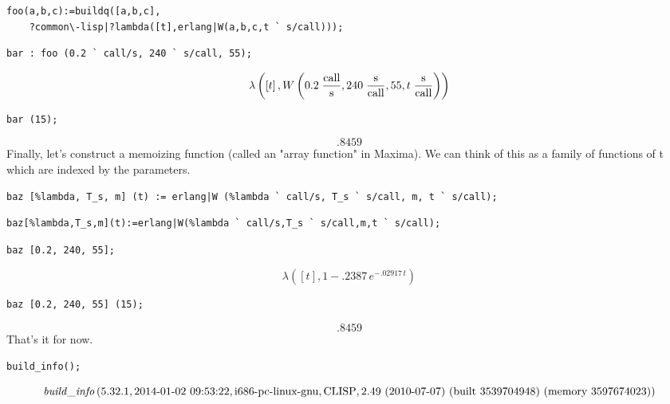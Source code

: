 \documentclass[12pt]{article}
\begin{document}
\begin{verbatim}
foo(a,b,c):=buildq([a,b,c],
    ?common\-lisp|?lambda([t],erlang|W(a,b,c,t ` s/call)));
\end{verbatim}

\begin{verbatim}
bar : foo (0.2 ` call/s, 240 ` s/call, 55);
\end{verbatim}
$$\lambda\left(\left[ t \right]  , W\left(0.2\;{{\mathrm{call}}\over{
 \mathrm{s}}} , 240\;{{\mathrm{s}}\over{\mathrm{call}}} , 55 , t\;{{
 \mathrm{s}}\over{\mathrm{call}}}\right)\right)$$
\begin{verbatim}
bar (15);
\end{verbatim}
$$.8459$$
Finally, let's construct a memoizing function (called an "array function" in Maxima).
We can think of this as a family of functions of t which are indexed by the parameters.
\begin{verbatim}
baz [%lambda, T_s, m] (t) := erlang|W (%lambda ` call/s, T_s ` s/call, m, t ` s/call);
\end{verbatim}

\begin{verbatim}
baz[%lambda,T_s,m](t):=erlang|W(%lambda ` call/s,T_s ` s/call,m,t ` s/call);
\end{verbatim}

\begin{verbatim}
baz [0.2, 240, 55];
\end{verbatim}
$$\lambda\left(\left[ t \right]  , 1-.2387\,e^ {- .02917\,t }\right)$$
\begin{verbatim}
baz [0.2, 240, 55] (15);
\end{verbatim}
$$.8459$$
That's it for now.
\begin{verbatim}
build_info();
\end{verbatim}
$${\it build\_info}\left(\mbox{{}5.32.1{}} , 
 \mbox{{}2014-01-02 09:53:22{}} , \mbox{{}i686-pc-linux-gnu{}} , 
 \mbox{{}CLISP{}} , 
 \mbox{{}2.49 (2010-07-07) (built 3539704948) (memory 3597674023){}}
 \right)$$
\end{document}
